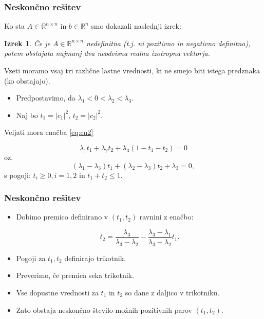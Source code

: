 \documentclass{beamer}
\newcommand{\abs}[1]{ \left\lvert#1\right\rvert}
\newcommand{\R}{\mathbb R}
\newtheorem{izrek}{Izrek}
\begin{document}
\begin{frame}
\frametitle{Neskončno rešitev}
Ko sta $A\in\R^{n\times n}$ in $b\in\R^n$ smo dokazali naslednji izrek: \medskip
\begin{izrek}
Če je $A\in\R^{n\times n}$ nedefinitna (t.j. ni pozitivno in negativno definitna), potem obstajata najmanj dva neodvisna realna izotropna vektorja.
\end{izrek}\pause \medskip

Vzeti moramo vsaj tri različne lastne vrednosti, ki ne smejo biti istega predznaka (ko obstajajo).

\end{frame}
\begin{frame}
\begin{itemize}
\item Predpostavimo, da $\lambda_1 <0<\lambda_2<\lambda_3$.\pause
\item Naj bo $t_1=\abs{c_1}^2$, $t_2=\abs{c_2}^2$.\pause
\end{itemize}
Veljati mora enačba \eqref{eq:en2}
\begin{block}{}
\begin{equation*}%
\lambda_1 t_1 +\lambda_2 t_2 +\lambda_3 (1- t_1 -t_2)=0
\end{equation*} oz.
\begin{equation*}
(\lambda_1 -\lambda_3)t_1 +(\lambda_2 -\lambda_3)t_2 +\lambda_3=0,
\end{equation*}
s pogoji: $t_i \ge 0, i=1,2$ in $t_1 +t_2\le1$.
\end{block}{}
\end{frame}
\begin{frame}
\frametitle{Neskončno rešitev}
\begin{itemize}
\item Dobimo premico definirano v $(t_1,t_2)$ ravnini z enačbo:
\begin{block}{}
$$t_2=\frac{\lambda_3}{\lambda_3 - \lambda_2} -\frac{\lambda_3 -\lambda_1}{\lambda_3 -\lambda_2}t_1.$$
\end{block}\pause
\item Pogoji za $t_1,t_2$ definirajo trikotnik.
\item Preverimo, če premica seka trikotnik.
\item Vse dopustne vrednosti za $t_1$ in $t_2$ so dane z daljico v trikotniku. 
\item Zato obstaja neskončno število možnih pozitivnih parov $(t_1,t_2)$.
\end{itemize}
\end{frame}
\end{document}

